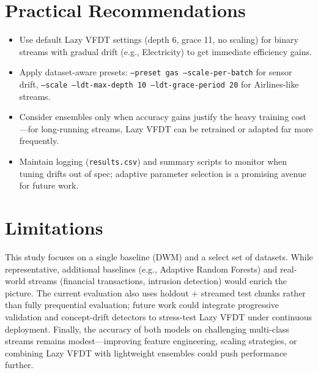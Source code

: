 \section{Practical Recommendations}
\begin{itemize}
    \item Use default Lazy VFDT settings (depth 6, grace 11, no scaling) for binary streams with gradual drift (e.g., Electricity) to get immediate efficiency gains.
    \item Apply dataset-aware presets: \texttt{--preset gas --scale-per-batch} for sensor drift, \texttt{--scale --ldt-max-depth 10 --ldt-grace-period 20} for Airlines-like streams.
    \item Consider ensembles only when accuracy gains justify the heavy training cost---for long-running streams, Lazy VFDT can be retrained or adapted far more frequently.
    \item Maintain logging (\texttt{results.csv}) and summary scripts to monitor when tuning drifts out of spec; adaptive parameter selection is a promising avenue for future work.
\end{itemize}

\section{Limitations}
This study focuses on a single baseline (DWM) and a select set of datasets. While representative, additional baselines (e.g., Adaptive Random Forests) and real-world streams (financial transactions, intrusion detection) would enrich the picture. The current evaluation also uses holdout + streamed test chunks rather than fully prequential evaluation; future work could integrate progressive validation and concept-drift detectors to stress-test Lazy VFDT under continuous deployment. Finally, the accuracy of both models on challenging multi-class streams remains modest---improving feature engineering, scaling strategies, or combining Lazy VFDT with lightweight ensembles could push performance further.
